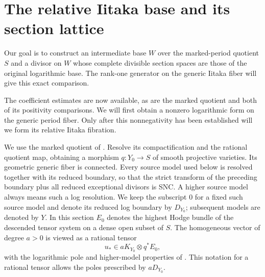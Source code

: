 \section{The relative Iitaka base and its section lattice}
\label{sec:relative-iitaka}

Our goal is to construct an intermediate base $W$ over the marked-period
quotient $S$ and a divisor on $W$ whose complete divisible section spaces
are those of the original logarithmic base. The rank-one generator on
the generic Iitaka fiber will give this exact comparison.

The coefficient estimates are now available, as are the marked quotient
and both of its positivity comparisons. We will first obtain a nonzero
logarithmic form on the generic period fiber. Only after this
nonnegativity has been established will we form its relative Iitaka
fibration.

We use the marked quotient of .  Resolve its
compactification and the rational quotient map, obtaining a morphism
\(q:Y_0\to S\) of smooth projective varieties.  Its geometric generic
fiber is connected.  Every source model used below is resolved together
with its reduced boundary, so that the strict transform of the preceding
boundary plus all reduced exceptional divisors is SNC.  A higher source
model always means such a log resolution.  We keep the subscript \(0\) for a fixed such source
model and denote its reduced log boundary by \(D_{Y_0}\); subsequent
models are denoted by \(Y\).  In this section \(E_0\)
denotes the highest Hodge bundle of the descended tensor system on a dense
open subset of \(S\).  The homogeneous vector of degree \(a>0\) is viewed
as a rational tensor
\[
 u_*\in aK_{Y_0}\otimes q^*E_0,
\]
with the logarithmic pole and higher-model properties of
.  This notation for a rational tensor
allows the poles prescribed by \(aD_{Y_0}\).


